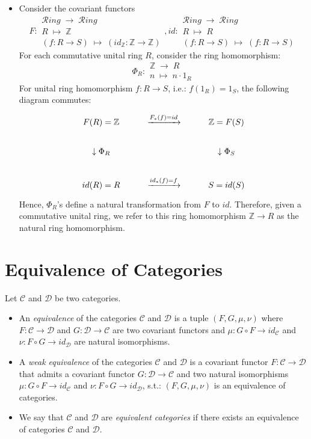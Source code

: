 \begin{itemize}
    \item Consider the covariant functors
    $$F: \substack{\mathcal{R}ing \; \to \; \mathcal{R}ing\\
    R \; \mapsto \; \mathbb{Z}\\
    (f:R \to S) \; \mapsto \;(id_\mathbb{Z}:\mathbb{Z} \to \mathbb{Z})} , id: \substack{\mathcal{R}ing \; \to \; \mathcal{R}ing\\
    R \; \mapsto \; R\\
    (f: R \to S) \; \mapsto \; (f: R \to S)}$$
    For each commutative unital ring $R$, consider the ring homomorphism:
    $$\Phi_R: \substack{\mathbb{Z} \; \to \; R\\
    n \; \mapsto \; n \cdot 1_R}$$
    For unital ring homomorphism $f: R \to S$, i.e.: $f(1_R) = 1_S$, the following diagram commutes:
    $$\begin{tikzcd}
        F(R) = \mathbb{Z} & \xrightarrow[]{F_*(f) = id} &\mathbb{Z} = F(S)\\
        \downarrow \Phi_R && \downarrow \Phi_S\\
        id(R) = R & \xrightarrow[]{id_*(f) = f} &S= id(S)
    \end{tikzcd}$$
    Hence, $\Phi_R$'s define a natural transformation from $F$ to $id$. Therefore, given a commutative unital ring, we refer to this ring homomorphism $\mathbb{Z} \to R$ as the natural ring homomorphism.
\end{itemize}

\section{Equivalence of Categories}

\begin{definition}
    Let $\mathcal{C}$ and $\mathcal{D}$ be two categories.
    \begin{itemize}
        \item An \textit{equivalence} of the categories $\mathcal{C}$ and $\mathcal{D}$ is a tuple $(F,G,\mu,\nu)$ where $F: \mathcal{C} \to \mathcal{D}$ and $G: \mathcal{D} \to \mathcal{C}$ are two covariant functors and $\mu : G \circ F \to id_\mathcal{C}$ and $\nu: F \circ G \to id_\mathcal{D}$ are natural isomorphisms.

        \item A \textit{weak equivalence} of the categories $\mathcal{C}$ and $\mathcal{D}$ is a covariant functor $F: \mathcal{C} \to \mathcal{D}$ that admits a covariant functor $G: \mathcal{D} \to \mathcal{C}$ and two natural isomorphisms $\mu: G \circ F \to id_\mathcal{C}$ and $\nu: F \circ G \to id_\mathcal{D}$, s.t.: $(F,G,\mu,\nu)$ is an equivalence of categories.

        \item We say that $\mathcal{C}$ and $\mathcal{D}$ are \textit{equivalent categories} if there exists an equivalence of categories $\mathcal{C}$ and $\mathcal{D}$.
    \end{itemize}
\end{definition}

